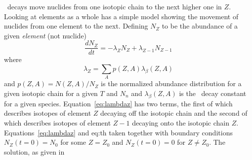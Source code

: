 
\bminus\ decays move nuclides from one isotopic chain to the next
higher one in $Z$.  Looking at elements as a whole \cite{iliadis2008}
has a simple model showing the movement of nuclides from one element
to the next.  Defining $N_Z$ to be the abundance of a given {\it
element} (not nuclide)
\begin{equation}
\label{eq:lambdaz}
\frac{dN_Z}{dt} = - \lambda_ZN_Z + \lambda_{Z-1}N_{Z-1}
\end{equation}
where
\begin{equation}
\label{eq:th}
\lambda_Z = \sum_Ap(Z,A)\lambda_\beta (Z,A)
\end{equation}
and $p(Z,A) = N(Z,A)/N_Z$ is the normalized abundance distribution for a given
isotopic chain for a given $T$ and $N_n$ and $\lambda_\beta (Z,A)$ is
the \bminus\ decay constant for a given species.
Equation~\ref{eq:lambdaz} has two terms, the first of which describes
isotopes of element $Z$ decaying off the isotopic chain and the second
of which describes isotopes of element $Z-1$ decaying onto the
isotopic chain $Z$.  Equations~\ref{eq:lambdaz} and {eq:th} taken
together with boundary conditions $N_Z(t=0)=N_0$ for some $Z=Z_0$  and
$N_Z(t=0)=0$ for $Z\neq Z_0$.  The solution, as given in
